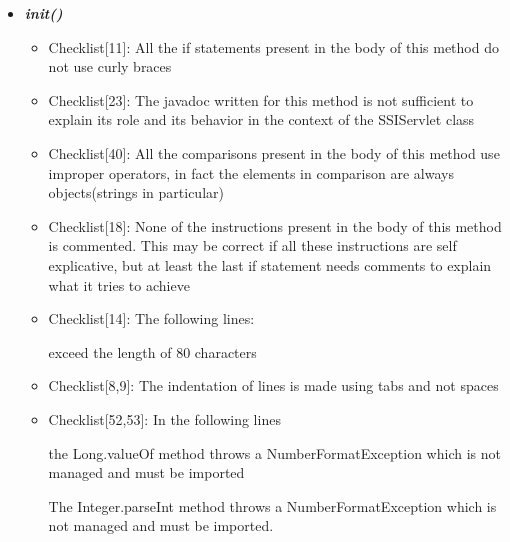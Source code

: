 \documentclass[11pt,titlepage]{article} %
\begin{document}
  \begin{itemize}
   \item \textbf{\textit{init()}}
   \begin{itemize}
    \item Checklist[11]: All the if statements present in the body of this method do not use curly braces
    \item Checklist[23]: The javadoc written for this method is not sufficient to explain its role and its behavior in the context of the SSIServlet class
    \item Checklist[40]: All the comparisons present in the body of this method use improper operators, in fact the elements in comparison are always objects(strings in particular)
    \item Checklist[18]: None of the instructions present in the body of this method is commented. This may be correct if all these instructions are self explicative, but at least the last if statement needs comments to explain what it tries to achieve
    \item Checklist[14]: The following lines:
      
      
      
      
      
      exceed the length of 80 characters
    \item Checklist[8,9]: The indentation of lines is made using tabs and not spaces
    \item Checklist[52,53]: In the following lines
      
      the Long.valueOf method throws a NumberFormatException which is not managed and must be imported
      
      
      The Integer.parseInt method throws a NumberFormatException which is not managed and must be imported.
   \end{itemize}


\end{itemize}
\end{document}
